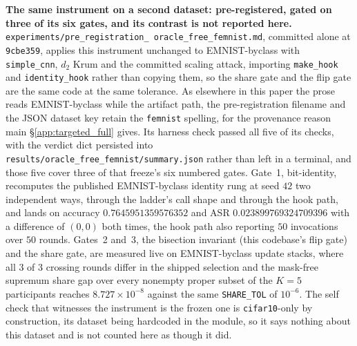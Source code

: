 \documentclass{article}
\begin{document}
\textbf{The same instrument on a second dataset: pre-registered, gated on three of its six gates, and
its contrast is not reported here.} \texttt{experiments/\allowbreak pre\_registration\_\allowbreak
oracle\_free\_\allowbreak femnist.md}, committed alone at \texttt{9cbe359}, applies this instrument
unchanged to EMNIST-byclass with \texttt{simple\_cnn}, $d_2$ Krum and the committed scaling attack,
importing \texttt{make\_hook} and \texttt{identity\_hook} rather than copying them, so the share gate
and the flip gate are the same code at the same tolerance. As elsewhere in this paper the prose reads
EMNIST-byclass while the artifact path, the pre-registration filename and the JSON dataset key retain
the \texttt{femnist} spelling, for the provenance reason main §\ref{app:targeted_full} gives. Its harness
check passed all five of its checks, with the verdict dict persisted into
\texttt{results/\allowbreak oracle\_free\_\allowbreak femnist/\allowbreak summary.json} rather than
left in a terminal, and those five cover three of that freeze's six numbered gates. Gate~1,
bit-identity, recomputes the published EMNIST-byclass identity rung at seed $42$ two independent ways,
through the ladder's call shape and through the hook path, and lands on
accuracy $0.7645951359576352$ and ASR $0.023899769324709396$ with a difference of $(0,0)$ both times,
the hook path also reporting $50$ invocations over $50$ rounds. Gates~2 and~3, the bisection invariant
(this codebase's flip gate) and the
share gate, are measured live on EMNIST-byclass update stacks, where all $3$ of $3$ crossing rounds
differ in the shipped selection and the mask-free supremum share gap over every nonempty proper subset of the
$K{=}5$ participants reaches $8.727{\times}10^{-8}$ against the same \texttt{SHARE\_TOL} of $10^{-6}$.
The self check that witnesses the instrument is the frozen one is \texttt{cifar10}-only by
construction, its dataset being hardcoded in the module, so it says nothing about this dataset and is
not counted here as though it did.
\end{document}
